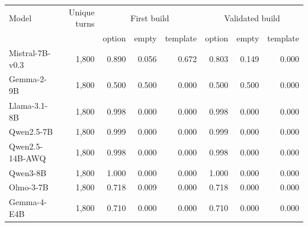 \begin{tabular}{lrrrrrrr}
\toprule
Model & Unique turns & \multicolumn{3}{c}{First build} & \multicolumn{3}{c}{Validated build} \\ & & option & empty & template & option & empty & template \\
\midrule
Mistral-7B-v0.3 & 1,800 & 0.890 & 0.056 & 0.672 & 0.803 & 0.149 & 0.000 \\
Gemma-2-9B & 1,800 & 0.500 & 0.500 & 0.000 & 0.500 & 0.500 & 0.000 \\
Llama-3.1-8B & 1,800 & 0.998 & 0.000 & 0.000 & 0.998 & 0.000 & 0.000 \\
Qwen2.5-7B & 1,800 & 0.999 & 0.000 & 0.000 & 0.999 & 0.000 & 0.000 \\
Qwen2.5-14B-AWQ & 1,800 & 0.998 & 0.000 & 0.000 & 0.998 & 0.000 & 0.000 \\
Qwen3-8B & 1,800 & 1.000 & 0.000 & 0.000 & 1.000 & 0.000 & 0.000 \\
Olmo-3-7B & 1,800 & 0.718 & 0.009 & 0.000 & 0.718 & 0.000 & 0.000 \\
Gemma-4-E4B & 1,800 & 0.710 & 0.000 & 0.000 & 0.710 & 0.000 & 0.000 \\
\bottomrule
\end{tabular}

